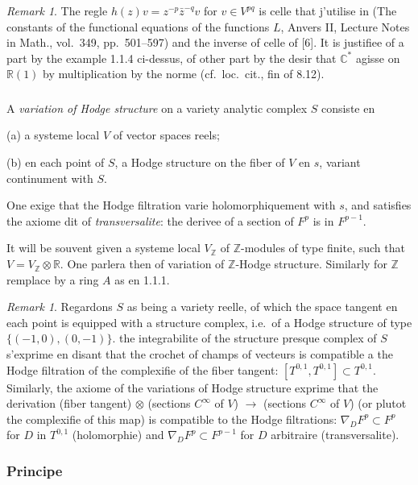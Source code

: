 \documentclass[12pt,a4paper]{article}
\theoremstyle{plain}
\theoremstyle{definition}
\theoremstyle{remark}
\newtheorem{remark}[theorem]{Remark}
\newcommand{\ZZ}{\mathbb{Z}}
\newcommand{\RR}{\mathbb{R}}
\newcommand{\CC}{\mathbb{C}}
\begin{document}
\begin{remark}
The regle $h(z)v = z^{-p}\bar{z}^{-q}v$ for $v \in V^{pq}$ is celle that j'utilise in (The constants of the functional equations of the functions $L$, Anvers II, Lecture Notes in Math., vol.~349, pp.~501--597) and the inverse of celle of [6]. It is justifiee of a part by the example 1.1.4 ci-dessus, of other part by the desir that $\CC^*$ agisse on $\RR(1)$ by multiplication by the norme (cf.~loc.~cit., fin of 8.12).
\end{remark}

\subsubsection{}

A \textit{variation of Hodge structure} on a variety analytic complex $S$ consiste en

(a) a systeme local $V$ of vector spaces reels;

(b) en each point of $S$, a Hodge structure on the fiber of $V$ en $s$, variant continument with $S$.

One exige that the Hodge filtration varie holomorphiquement with $s$, and satisfies the axiome dit of \textit{transversalite}: the derivee of a section of $F^p$ is in $F^{p-1}$.

It will be souvent given a systeme local $V_{\ZZ}$ of $\ZZ$-modules of type finite, such that $V = V_{\ZZ} \otimes \RR$. One parlera then of variation of $\ZZ$-Hodge structure. Similarly for $\ZZ$ remplace by a ring $A$ as en 1.1.1.

\begin{remark}
Regardons $S$ as being a variety reelle, of which the space tangent en each point is equipped with a structure complex, i.e.~of a Hodge structure of type $\{(-1,0),(0,-1)\}$. the integrabilite of the structure presque complex of $S$ s'exprime en disant that the crochet of champs of vecteurs is compatible a the Hodge filtration of the complexifie of the fiber tangent: $[T^{0,1}, T^{0,1}] \subset T^{0,1}$. Similarly, the axiome of the variations of Hodge structure exprime that the derivation (fiber tangent) $\otimes$ (sections $C^{\infty}$ of $V$) $\to$ (sections $C^{\infty}$ of $V$) (or plutot the complexifie of this map) is compatible to the Hodge filtrations: $\nabla_D F^p \subset F^p$ for $D$ in $T^{0,1}$ (holomorphie) and $\nabla_D F^p \subset F^{p-1}$ for $D$ arbitraire (transversalite).
\end{remark}

\subsubsection{Principe}
\end{document}
